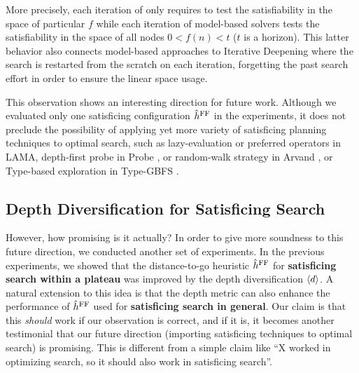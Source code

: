 More precisely, each iteration of \astar only requires to test the satisfiability in the space of particular
$f$ while each iteration of model-based solvers tests the satisfiability in the space of all nodes $0<f(n)<t$
($t$ is a horizon).  This latter behavior also connects model-based approaches to Iterative Deepening \astar
\cite{korf1985depth} where the search is restarted from the scratch on each iteration, forgetting the past search
effort in order to ensure the linear space usage.
% 
% 

This observation shows an interesting direction for future work.
Although we evaluated only one \sota satisficing configuration $\hat{h}^{\text{FF}}$ in
the experiments, it does not preclude the possibility of applying yet
more variety of satisficing planning techniques to optimal search, such as lazy-evaluation
or preferred operators in LAMA, depth-first probe in Probe \cite{LipovetzkyG11}, or
random-walk strategy in Arvand \cite{nakhost2009monte}, or Type-based
exploration in Type-GBFS \cite{xie14type}.

\subsection{Depth Diversification for Satisficing Search}

However, how promising is it actually? In order to give more soundness to this future direction, we conducted
another set of experiments. In the previous experiments, we showed that the distance-to-go \ff heuristic $\hat{h}^{\text{FF}}$ for
\textbf{satisficing search within a plateau} was improved by the depth diversification ${\left<d\right>}$.
% 
A natural extension to this idea is that the depth metric can also enhance the performance of $\hat{h}^{\text{FF}}$ used for
\textbf{satisficing search in general}.
% 
Our claim is that this \emph{should} work if our observation is correct, and if it is, it becomes another
testimonial that our future direction (importing satisficing techniques to optimal search) is promising.
This is different from a simple claim like ``X worked in optimizing search, so it should also work in satisficing search''.

